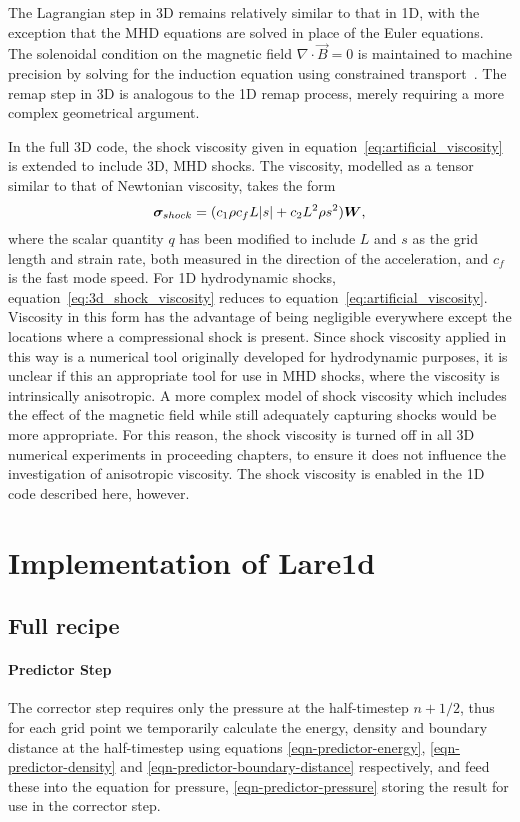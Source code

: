 The Lagrangian step in 3D remains relatively similar to that in 1D, with the exception that the MHD equations are solved in place of the Euler equations. The solenoidal condition on the magnetic field $\nabla \cdot \vec{B} =0$ is maintained to machine precision by solving for the induction equation using constrained transport~\cite{evansSimulationMagnetohydrodynamicFlows1988a}. The remap step in 3D is analogous to the 1D remap process, merely requiring a more complex geometrical argument. 

In the full 3D code, the shock viscosity given in equation~\eqref{eq:artificial_viscosity} is extended to include 3D, MHD shocks. The viscosity, modelled as a tensor similar to that of Newtonian viscosity, takes the form
\begin{equation}
  \label{eq:3d_shock_viscosity}
{\bm \sigma}_{shock} = (c_1 \rho c_f L |s| + c_2 L^2 \rho s^2) {\bm W},
\end{equation}
where the scalar quantity $q$ has been modified to include $L$ and $s$ as the grid length and strain rate, both measured in the direction of the acceleration, and $c_f$ is the fast mode speed. For 1D hydrodynamic shocks, equation~\eqref{eq:3d_shock_viscosity} reduces to equation~\eqref{eq:artificial_viscosity}. Viscosity in this form has the advantage of being negligible everywhere except the locations where a compressional shock is present. Since shock viscosity applied in this way is a numerical tool originally developed for hydrodynamic purposes, it is unclear if this an appropriate tool for use in MHD shocks, where the viscosity is intrinsically anisotropic. A more complex model of shock viscosity which includes the effect of the magnetic field while still adequately capturing shocks would be more appropriate. For this reason, the shock viscosity is turned off in all 3D numerical experiments in proceeding chapters, to ensure it does not influence the investigation of anisotropic viscosity. The shock viscosity is enabled in the 1D code described here, however.

\section{Implementation of Lare1d}
\subsection{Full recipe}
\paragraph{Predictor Step}
The corrector step requires only the pressure at the half-timestep $n+1/2$, thus for each grid point we temporarily calculate the energy, density and boundary distance at the half-timestep using equations \eqref{eqn-predictor-energy}, \eqref{eqn-predictor-density} and \eqref{eqn-predictor-boundary-distance} respectively, and feed these into the equation for pressure, \eqref{eqn-predictor-pressure} storing the result for use in the corrector step.


